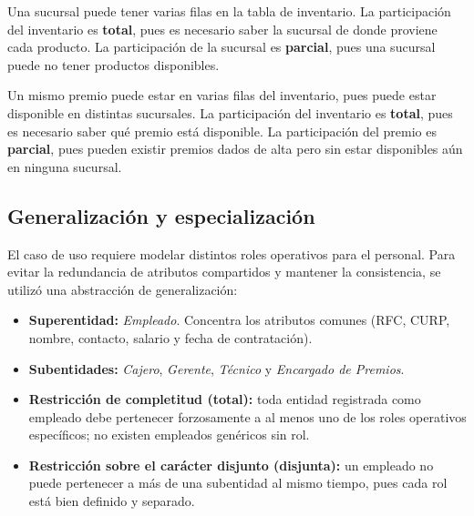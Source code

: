 \documentclass[11pt,letterpaper,spanish]{article}
\newcommand{\marcaOriginal}{}
\begin{document}
\begin{description}[leftmargin=0pt, style=nextline]
	\item[REGISTRAR --- Sucursal $\leftrightarrow$ Inventario \textnormal{(1:N)}]
		Una sucursal puede tener varias filas en la tabla de inventario. La participación
		del inventario es \textbf{total}, pues es necesario saber la sucursal de donde
		proviene cada producto. La participación de la sucursal es \textbf{parcial}, pues
		una sucursal puede no tener productos disponibles.

	\item[CONTENER --- Premio $\leftrightarrow$ Inventario \textnormal{(1:N)}]
		Un mismo premio puede estar en varias filas del inventario, pues puede estar
		disponible en distintas sucursales. La participación del inventario es
		\textbf{total}, pues es necesario saber qué premio está disponible. La
		participación del premio es \textbf{parcial}, pues pueden existir premios dados de
		alta pero sin estar disponibles aún en ninguna sucursal.

\end{description}

\subsection*{Generalización y especialización \marcaOriginal}

El caso de uso requiere modelar distintos roles operativos para el personal. Para evitar la
redundancia de atributos compartidos y mantener la consistencia, se utilizó una abstracción
de generalización:

\begin{itemize}
	\item \textbf{Superentidad:} \emph{Empleado}. Concentra los atributos comunes (RFC,
	      CURP, nombre, contacto, salario y fecha de contratación).
	\item \textbf{Subentidades:} \emph{Cajero}, \emph{Gerente}, \emph{Técnico} y
	      \emph{Encargado de Premios}.
	\item \textbf{Restricción de completitud (total):} toda entidad registrada como empleado
	      debe pertenecer forzosamente a al menos uno de los roles operativos específicos;
	      no existen empleados genéricos sin rol.
	\item \textbf{Restricción sobre el carácter disjunto (disjunta):} un empleado no puede
	      pertenecer a más de una subentidad al mismo tiempo, pues cada rol está bien
	      definido y separado.
\end{itemize}
\end{document}

